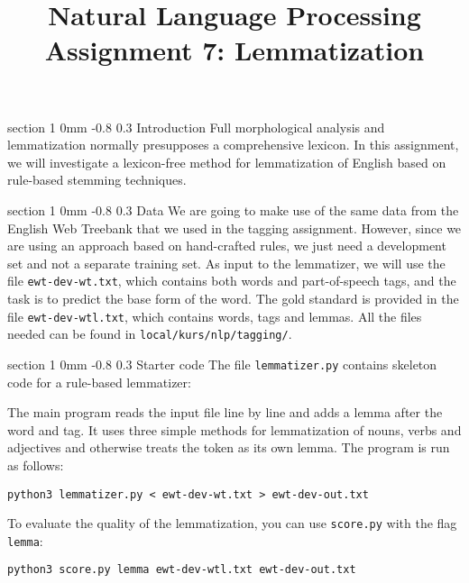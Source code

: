 \documentclass[11pt]{article}
\title{{\LARGE Natural Language Processing}\\[1.5mm]{\large Assignment 7: Lemmatization}}
\author{}
\date{} %
\makeatletter
\newcommand{\newsec}[2]{\section{#1}\label{sec:#2}\noindent}
\renewcommand{\section}{\@startsection
{section}%
{1}%
{0mm}%
{-0.8\baselineskip}%
{0.3\baselineskip}%
{\bfseries\large}}%
\makeatother
\begin{document}
 

\maketitle
\vspace{-2mm}
\newsec{Introduction}{intro}%
Full morphological analysis and lemmatization normally presupposes a comprehensive lexicon. In this assignment, we will investigate a lexicon-free method for lemmatization of English
based on rule-based stemming techniques. 

\newsec{Data}{data}%
We are going to make use of the same data from the English Web Treebank that we used in the tagging assignment. However, since we are using an approach based on
hand-crafted rules, we just need a development set and not a separate training set. As input to the lemmatizer, we will use the file {\tt ewt-dev-wt.txt}, which contains both words
and part-of-speech tags, and the task is to predict the base form of the word. The gold standard is provided in the file {\tt ewt-dev-wtl.txt}, which contains words, tags and lemmas.
All the files needed can be found in {\tt local/kurs/nlp/tagging/}.

\newsec{Starter code}{code}%
The file {\tt lemmatizer.py} contains skeleton code for a rule-based lemmatizer:
\begin{center}
\fbox{

}
\end{center}
The main program reads the input file line by line and adds a lemma after the word and tag. It uses three simple methods for lemmatization of nouns, verbs and adjectives 
and otherwise treats the token as its own lemma. The program is run as follows:
\begin{verbatim}
python3 lemmatizer.py < ewt-dev-wt.txt > ewt-dev-out.txt
\end{verbatim}
To evaluate the quality of the lemmatization, you can use {\tt score.py} with the flag {\tt lemma}:
\begin{verbatim}
python3 score.py lemma ewt-dev-wtl.txt ewt-dev-out.txt
\end{verbatim}
\end{document}
